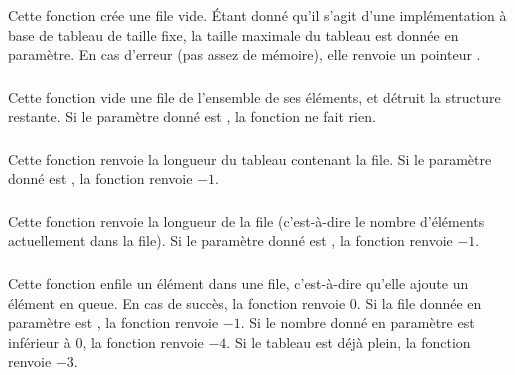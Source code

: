 \subsubsection*{}

\noindent Cette fonction crée une file vide.
\'Etant donné qu'il s'agit d'une implémentation à base de tableau de taille fixe, la taille maximale du tableau est donnée en paramètre.
En cas d'erreur (pas assez de mémoire), elle renvoie un pointeur .


\subsubsection*{}

\noindent Cette fonction vide une file de l'ensemble de ses éléments, et détruit la structure restante.
Si le paramètre donné est , la fonction ne fait rien.


\subsubsection*{}

\noindent Cette fonction renvoie la longueur du tableau contenant la file.
Si le paramètre donné est , la fonction renvoie $ -1 $.


\subsubsection*{}

\noindent Cette fonction renvoie la longueur de la file (c'est-à-dire le nombre d'éléments actuellement dans la file).
Si le paramètre donné est , la fonction renvoie $ -1 $.


\subsubsection*{}

\noindent Cette fonction enfile un élément dans une file, c'est-à-dire qu'elle ajoute un élément en queue.
En cas de succès, la fonction renvoie $ 0 $.
Si la file donnée en paramètre est , la fonction renvoie $ -1 $.
Si le nombre donné en paramètre est inférieur à $ 0 $, la fonction renvoie $ -4 $.
Si le tableau est déjà plein, la fonction renvoie $ -3 $.


